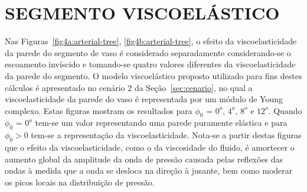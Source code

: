 \section{SEGMENTO VISCOELÁSTICO}\label{sec:cenario2}

Nas Figuras~\ref{fig4a:arterial-tree}, \ref{fig4b:arterial-tree}, o efeito da viscoelasticidade da parede do segmento de vaso é considerado separadamente considerando-se o escoamento invíscido e tomando-se quatro valores diferentes da viscoelasticidade da parede do segmento. O modelo viscoelástico proposto utilizado para fins destes cálculos é apresentado no cenário 2 da Seção~\ref{sec:cenario}, no qual a viscoelasticidade da parede do vaso é representada por um módulo de Young complexo. Estas figuras mostram os resultados para $\phi_0$ = $0^o$, $4^o$, $8^o$ e $12^o$. Quando $\phi_0$ = $0^o$ tem-se um valor representando uma parede puramente elástica e para $\phi_0> 0$ tem-se a representação da viscoelasticidade. Nota-se a partir destas figuras que o efeito da viscoelasticidade, como o da viscosidade do fluido, é amortecer o aumento global da amplitude da onda de pressão causada pelas reflexões das ondas à medida que a onda se desloca na direção à jusante, bem como moderar os picos locais na distribuição de pressão. 

